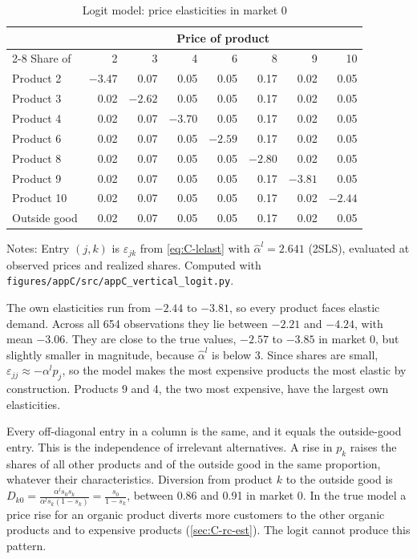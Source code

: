 \begin{table}[htbp]
\centering
\caption{Logit model: price elasticities in market 0}
\label{tab:C-lelast}
\small
\begin{tabular}{@{}lrrrrrrr@{}}
\toprule
 & \multicolumn{7}{c}{Price of product} \\
\cmidrule(lr){2-8}
Share of & 2 & 3 & 4 & 6 & 8 & 9 & 10 \\
\midrule
Product 2 & $-3.47$ & 0.07 & 0.05 & 0.05 & 0.17 & 0.02 & 0.05 \\
Product 3 & 0.02 & $-2.62$ & 0.05 & 0.05 & 0.17 & 0.02 & 0.05 \\
Product 4 & 0.02 & 0.07 & $-3.70$ & 0.05 & 0.17 & 0.02 & 0.05 \\
Product 6 & 0.02 & 0.07 & 0.05 & $-2.59$ & 0.17 & 0.02 & 0.05 \\
Product 8 & 0.02 & 0.07 & 0.05 & 0.05 & $-2.80$ & 0.02 & 0.05 \\
Product 9 & 0.02 & 0.07 & 0.05 & 0.05 & 0.17 & $-3.81$ & 0.05 \\
Product 10 & 0.02 & 0.07 & 0.05 & 0.05 & 0.17 & 0.02 & $-2.44$ \\
Outside good & 0.02 & 0.07 & 0.05 & 0.05 & 0.17 & 0.02 & 0.05 \\
\bottomrule
\end{tabular}

\vspace{3pt}
\begin{minipage}{0.97\textwidth}
\footnotesize Notes: Entry $(j, k)$ is $\varepsilon_{jk}$ from \eqref{eq:C-lelast} with
$\hat\alpha^l = 2.641$ (2SLS), evaluated at observed prices and realized shares. Computed with \texttt{figures/appC/src/appC\_vertical\_logit.py}.
\end{minipage}
\end{table}

The own elasticities run from $-2.44$ to $-3.81$, so every product faces elastic demand. Across all 654 observations
they lie between $-2.21$ and $-4.24$, with mean $-3.06$. They are close to the true values, $-2.57$ to $-3.85$ in market
0, but slightly smaller in magnitude, because $\hat\alpha^l$ is below 3. Since shares are small,
$\varepsilon_{jj} \approx -\alpha^l p_j$, so the model makes the most expensive products the most elastic by
construction. Products 9 and 4, the two most expensive, have the largest own elasticities.

Every off-diagonal entry in a column is the same, and it equals the outside-good entry. This is the independence of
irrelevant alternatives. A rise in $p_k$ raises the shares of all other products and of the outside good in the same
proportion, whatever their characteristics. Diversion from product $k$ to the outside good is
$D_{k0} = \frac{\alpha^l s_0s_k}{\alpha^l s_k(1 - s_k)} = \frac{s_0}{1 - s_k}$, between 0.86 and 0.91 in market 0. In the
true model a price rise for an organic product diverts more customers to the other organic products and to expensive
products (\cref{sec:C-rc-est}). The logit cannot produce this pattern.

